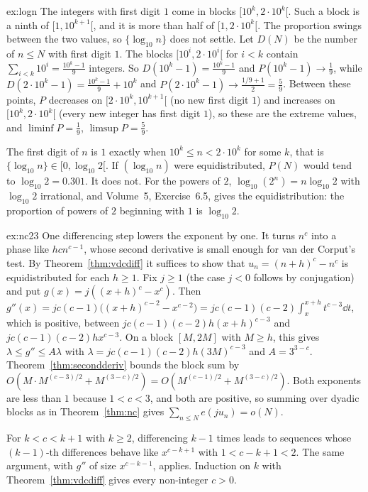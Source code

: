 \begin{solution}{ex:logn}
\idea The integers with first digit $1$ come in blocks $[10^k,2\cdot10^k[$. Such a block is a ninth of $[1,10^{k+1}[$, and it is more than half of $[1,2\cdot10^k[$. The proportion swings between the two values, so $\{\log_{10}n\}$ does not settle.
\writeup Let $D(N)$ be the number of $n\le N$ with first digit $1$. The blocks $[10^i,2\cdot10^i[$ for $i<k$ contain $\sum_{i<k}10^i=\frac{10^k-1}9$ integers. So $D(10^k-1)=\frac{10^k-1}9$ and $P(10^k-1)\to\frac19$, while
$D(2\cdot10^k-1)=\frac{10^k-1}9+10^k$ and $P(2\cdot10^k-1)\to\frac{1/9+1}2=\frac59$. Between these points, $P$ decreases on $[2\cdot10^k,10^{k+1}[$ (no new first digit $1$) and increases on $[10^k,2\cdot10^k[$ (every new integer has first digit $1$), so these
are the extreme values, and $\liminf P=\frac19$, $\limsup P=\frac59$.

The first digit of $n$ is $1$ exactly when $10^k\le n<2\cdot10^k$ for some $k$, that is $\{\log_{10}n\}\in[0,\log_{10}2[$. If $(\log_{10}n)$ were equidistributed, $P(N)$ would tend to $\log_{10}2=0.301$. It does not. For the powers of $2$,
$\log_{10}(2^n)=n\log_{10}2$ with $\log_{10}2$ irrational, and Volume~5, Exercise~6.5, gives the equidistribution: the proportion of powers of $2$ beginning with $1$ is $\log_{10}2$.
\end{solution}

\begin{solution}{ex:nc23}
\idea One differencing step lowers the exponent by one. It turns $n^c$ into a phase like $hcn^{c-1}$, whose second derivative is small enough for van der Corput's test.
\writeup By Theorem~\ref{thm:vdcdiff} it suffices to show that $u_n=(n+h)^c-n^c$ is equidistributed for each $h\ge1$. Fix $j\ge1$ (the case $j<0$ follows by conjugation) and put $g(x)=j((x+h)^c-x^c)$. Then
$g''(x)=jc(c-1)\bigl((x+h)^{c-2}-x^{c-2}\bigr)=jc(c-1)(c-2)\int_x^{x+h}t^{c-3}\dd t$, which is positive, between $jc(c-1)(c-2)h(x+h)^{c-3}$ and $jc(c-1)(c-2)hx^{c-3}$. On a block $[M,2M]$ with $M\ge h$, this gives
$\lambda\le g''\le A\lambda$ with $\lambda=jc(c-1)(c-2)h(3M)^{c-3}$ and $A=3^{3-c}$. Theorem~\ref{thm:secondderiv} bounds the block sum by $O(M\cdot M^{(c-3)/2}+M^{(3-c)/2})=O(M^{(c-1)/2}+M^{(3-c)/2})$. Both exponents are less than $1$
because $1<c<3$, and both are positive, so summing over dyadic blocks as in Theorem~\ref{thm:nc} gives $\sum_{n\le N}e(ju_n)=o(N)$.

For $k<c<k+1$ with $k\ge2$, differencing $k-1$ times leads to sequences whose $(k-1)$-th differences behave like $x^{c-k+1}$ with $1<c-k+1<2$. The same argument, with $g''$ of size $x^{c-k-1}$, applies.
Induction on $k$ with Theorem~\ref{thm:vdcdiff} gives every non-integer $c>0$.
\end{solution}

